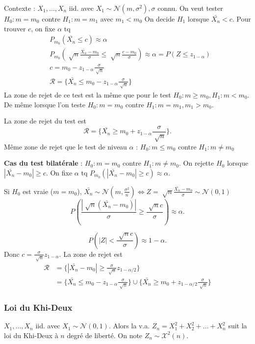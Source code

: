 \documentclass{article}
\theoremstyle{plain}%
\theoremstyle{definition}
\theoremstyle{remark}
\begin{document}
Contexte : $ X_1, \dots, X_n $ iid. avec $ X_1 \sim \mathcal{N}(m, \sigma ^2), \sigma$ connu. On veut tester $ H_0:m=m_0 $ contre $ H_1: m = m_1 $ avec $ m_1 < m_0 $ On decide $ H_1 $ lorsque $ \bar{X_n} < c $. Pour trouver $ c $, on fixe $ \alpha  $ tq 
\begin{align*}
    & P_{m_0} (\bar{X_n} \leq c) \approx \alpha \\
    & P_{m_0} (\sqrt[]{n} \frac{\bar{X_n} - m_0}{\sigma } \leq \sqrt[]{n} \frac{ c - m_0}{\sigma }) \approx \alpha = P(Z \leq z_{1-\alpha }) \\
    & c = m_0 - z_{1 - \alpha } \frac{\sigma }{\sqrt[]{n}} \\
    & \mathcal{R} = \{\bar{X_n} \leq m_0 - z_{1 - \alpha } \frac{\sigma }{\sqrt[]{n}}\}
\end{align*}
La zone de rejet de ce test est la même que pour le test $ H_0: m \geq m_0, H_1: m < m_0 $. \\
De même lorsque l'on teste $ H_0: m=m_0 $  contre $ H_1: m=m_1, m_1 > m_0 $. 

La zone de rejet du test est 
\[
    \mathcal{R}= \{\bar{X_n} \geq m_0 + z_{1-\alpha } \frac{\sigma }{\sqrt[]{n}}\}
.\]
Même zone de rejet que le test de niveau $ \alpha  $ : $ H_0: m \leq m_0 $ contre $ H_1: m \neq m_0 $ 

\textbf{Cas du test bilatérale} : $ H_0: m=m_0 $ contre $ H_1: m \neq m_0 $. On rejette $ H_0 $ lorsque $ \left| \bar{X_n} - m_0 \right| \geq c $. On fixe $ \alpha  $ tq $ P_{m_0} (\left| \bar{X_n} - m_0 \right| \geq c) \approx \alpha $.

Si $ H_0 $ est vraie ($ m=m_0 $), $ \bar{X_n} \sim \mathcal{N}(m, \frac{\sigma ^2}{n}) \Leftrightarrow Z = \sqrt[]{n} \frac{\bar{X_n} - m_0}{\sigma } \sim \mathcal{N} (0,1)$ 
\[
    P(\frac{\left| \sqrt[]{n} (\bar{X_n} - m_0) \right| }{\sigma } \geq \frac{\sqrt[]{n} c}{\sigma }) \approx \alpha 
.\]

\[
    P(\left| Z \right| < \frac{\sqrt[]{n} c}{\sigma }) \approx 1- \alpha 
.\]
Donc $ c = \frac{\sigma }{\sqrt[]{n}}z_{1-\alpha} $. La zone de rejet est 
\begin{align*}
    \mathcal{R} &= \{\left| \bar{X_n} - m_0 \right| \geq \frac{\sigma}{\sqrt[]{n}} z_{1 - \alpha/2}\} \\
        &= \{\bar{X_n} \leq m_0 - z_{1- \alpha } \frac{\sigma }{\sqrt[]{n}}\} \cup \{\bar{X_n} \geq m_0 + z_{1-\alpha /2} \frac{\sigma }{\sqrt[]{n}}\} 
\end{align*}

\subsubsection{Loi du Khi-Deux}
$ X_1,\dots,X_n $ iid. avec $ X_1 \sim \mathcal{N}(0,1) $. Alors la v.a. $ Z_n = X_1^2 + X_2^2 + \dots + X_n^2 $ suit la loi du Khi-Deux à $ n $ degré de liberté. On note $ Z_n \sim \mathcal{X}^2(n) $. 
\end{document}
